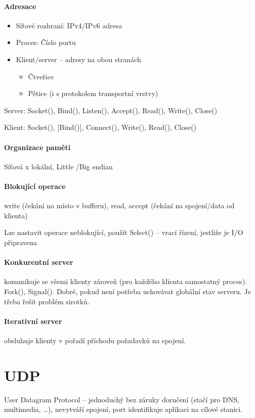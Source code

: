 \documentclass[a4paper, 11pt]{report}
\begin{document}
\paragraph{Adresace}
\begin{itemize}
	\item Síťové rozhraní: IPv4/IPv6 adresa
	\item Proces: Číslo portu
	\item Klient/server -- adresy na obou stranách
	\begin{itemize}
		\item Čtveřice
		\item Pětice (i s protokolem transportní vrstvy)
	\end{itemize}
\end{itemize}

Server: Socket(), Bind(), Listen(), Accept(), Read(), Write(), Close()

Klient: Socket(), [Bind()], Connect(), Write(), Read(), Close()

\paragraph{Organizace paměti}
Síťová x lokální, Little /Big endian

\paragraph{Blokující operace}
write (čekání na místo v bufferu), read, accept (čekání na spojení/data od klienta)

Lze nastavit operace neblokující, použít Select() -- vrací řízení, jestliže je I/O připravena

\paragraph{Konkurentní server} komunikuje se všemi klienty zároveň (pro každého klienta samostatný proces). Fork(), Signal(). Dobré, pokud není potřeba uchovávat globální stav serveru. Je třeba řešit problém sirotků.

\paragraph{Iterativní server} obsluhuje klienty v pořadí příchodu požadavků na spojení.

\section{UDP}
User Datagram Protocol -- jednoduchý bez záruky doručení (stačí pro DNS, multimedia, \dots), nevytváří spojení, port identifikuje aplikaci na cílové stanici.
\end{document}
